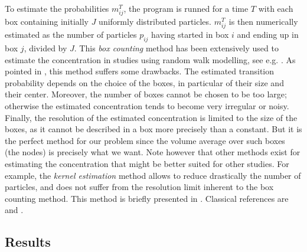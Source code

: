 To estimate the probabilities $m^T_{ij}$, the program is runned for a time $T$ with each box containing initially $J$ uniformly distributed particles. $m^T_{ij}$ is then numerically estimated as the number of particles $p_{ij}$ having started in box $i$ and ending up in box $j$, divided by $J$. This \textit{box counting} method has been extensively used to estimate the concentration in studies using random walk modelling, see e.g. \cite{riddle1998specification}. As pointed in \cite{spivakovskaya2007lagrangian}, this method suffers some drawbacks. The estimated transition probability depends on the choice of the boxes, in particular of their size and their center. Moreover, the number of boxes cannot be chosen to be too large; otherwise the estimated concentration tends to become very irregular or noisy. Finally, the resolution of the estimated concentration is limited to the size of the boxes, as it cannot be described in a box more precisely than a constant. But it is the perfect method for our problem since the volume average over such boxes (the nodes) is precisely what we want. Note however that other methods exist for estimating the concentration that might be better suited for other studies. For example, the \textit{kernel estimation} method allows to reduce drastically the number of particles, and does not suffer from the resolution limit inherent to the box counting method. This method is briefly presented in \cite{spivakovskaya2007lagrangian}. Classical references are \cite{silverman1986density} and \cite{wand1995kernel}.

\subsection{Results}